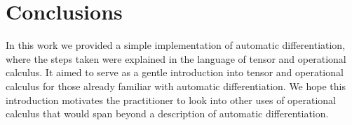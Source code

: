 \section{Conclusions}

In this work we provided a simple implementation of automatic differentiation, where the steps taken were explained in the language of tensor and operational calculus. It aimed to serve as a gentle introduction into tensor and operational calculus for those already familiar with automatic differentiation.
We hope this introduction motivates the practitioner to look into other uses of operational calculus that would span beyond a description of automatic differentiation.
